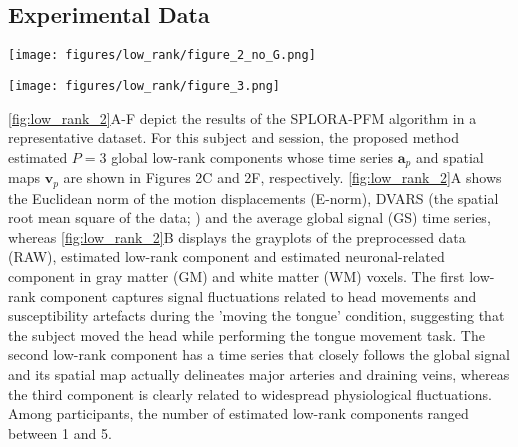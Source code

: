 \subsection{Experimental Data}

\begin{figure*}[th!]
    \centering
    \texttt{[image: figures/low\_rank/figure\_2\_no\_G.png]}
    \caption{A) Euclidean norm of the motion displacements (E-norm) (blue),
    DVARS (black) and global (gray) signals of the fMRI data; B) Grayplots of
    gray matter (GM) and white matter (WM) of the preprocessed fMRI
    data, the estimated low-rank and neuronal-related components; C) Time series
    and F) maps of the estimated low-rank components; D) Time series and E) maps
    of representative single-trial neuronal-related (motor) activity. The color
    bands in the plots with the time series illustrate the timing of the
    different conditions.}
    \label{fig:low_rank_2}
\end{figure*}


\begin{figure*}[th!]
    \centering
    \texttt{[image: figures/low\_rank/figure\_3.png]}
    \caption{ROC values of the five conditions for the three algorithms tested:
    SPFM, MV-SPFM and SPLORA-PFM (red, dark-purple and dark-green dots
    correspond to the subject in \cref{fig:low_rank_2}).}
    \label{fig:low_rank_3}
\end{figure*}


\cref{fig:low_rank_2}A-F depict the results of the SPLORA-PFM algorithm in a
representative dataset. For this subject and session, the proposed method
estimated $P=3$ global low-rank components whose time series $\mathbf{a}_p$ and
spatial maps $\mathbf{v}_p$ are shown in Figures 2C and 2F, respectively.
\cref{fig:low_rank_2}A shows the Euclidean norm of the motion displacements
(E-norm), DVARS (the spatial root mean square of the data;
\cite{Smyser2011FunctionalconnectivityMRI,Power2012Spurioussystematiccorrelations})
and the average global signal (GS) time series, whereas \cref{fig:low_rank_2}B
displays the grayplots of the preprocessed data (RAW), estimated low-rank
component and estimated neuronal-related component in gray matter (GM) and white
matter (WM) voxels. The first low-rank component captures signal fluctuations
related to head movements and susceptibility artefacts during the 'moving the
tongue' condition, suggesting that the subject moved the head while performing
the tongue movement task. The second low-rank component has a time series that
closely follows the global signal and its spatial map actually delineates major
arteries and draining veins, whereas the third component is clearly related to
widespread physiological fluctuations. Among participants, the number of
estimated low-rank components ranged between 1 and 5.

